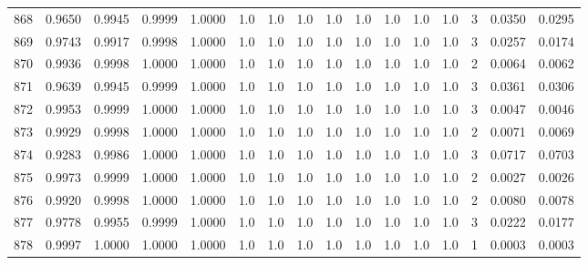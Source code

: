 \begin{tabular}{lrrrrrrrrrrrrrrr}
868 &      0.9650 &  0.9945 &  0.9999 &  1.0000 &     1.0 &     1.0 &     1.0 &     1.0 &     1.0 &     1.0 &      1.0 &        1.0 &      3 &                    0.0350 &                     0.0295 \\
869 &      0.9743 &  0.9917 &  0.9998 &  1.0000 &     1.0 &     1.0 &     1.0 &     1.0 &     1.0 &     1.0 &      1.0 &        1.0 &      3 &                    0.0257 &                     0.0174 \\
870 &      0.9936 &  0.9998 &  1.0000 &  1.0000 &     1.0 &     1.0 &     1.0 &     1.0 &     1.0 &     1.0 &      1.0 &        1.0 &      2 &                    0.0064 &                     0.0062 \\
871 &      0.9639 &  0.9945 &  0.9999 &  1.0000 &     1.0 &     1.0 &     1.0 &     1.0 &     1.0 &     1.0 &      1.0 &        1.0 &      3 &                    0.0361 &                     0.0306 \\
872 &      0.9953 &  0.9999 &  1.0000 &  1.0000 &     1.0 &     1.0 &     1.0 &     1.0 &     1.0 &     1.0 &      1.0 &        1.0 &      3 &                    0.0047 &                     0.0046 \\
873 &      0.9929 &  0.9998 &  1.0000 &  1.0000 &     1.0 &     1.0 &     1.0 &     1.0 &     1.0 &     1.0 &      1.0 &        1.0 &      2 &                    0.0071 &                     0.0069 \\
874 &      0.9283 &  0.9986 &  1.0000 &  1.0000 &     1.0 &     1.0 &     1.0 &     1.0 &     1.0 &     1.0 &      1.0 &        1.0 &      3 &                    0.0717 &                     0.0703 \\
875 &      0.9973 &  0.9999 &  1.0000 &  1.0000 &     1.0 &     1.0 &     1.0 &     1.0 &     1.0 &     1.0 &      1.0 &        1.0 &      2 &                    0.0027 &                     0.0026 \\
876 &      0.9920 &  0.9998 &  1.0000 &  1.0000 &     1.0 &     1.0 &     1.0 &     1.0 &     1.0 &     1.0 &      1.0 &        1.0 &      2 &                    0.0080 &                     0.0078 \\
877 &      0.9778 &  0.9955 &  0.9999 &  1.0000 &     1.0 &     1.0 &     1.0 &     1.0 &     1.0 &     1.0 &      1.0 &        1.0 &      3 &                    0.0222 &                     0.0177 \\
878 &      0.9997 &  1.0000 &  1.0000 &  1.0000 &     1.0 &     1.0 &     1.0 &     1.0 &     1.0 &     1.0 &      1.0 &        1.0 &      1 &                    0.0003 &                     0.0003 \\

\end{tabular}
